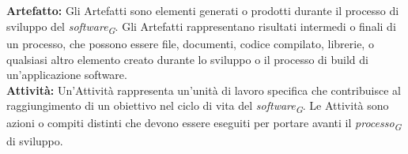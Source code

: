 \documentclass{article}
\begin{document}
\\
\\
\textbf{Artefatto:} Gli Artefatti sono elementi generati o prodotti durante il processo di sviluppo del \textit{software}\textsubscript{\textit{G}}. Gli Artefatti rappresentano risultati intermedi o finali di un processo, che possono essere file, documenti, codice compilato, librerie, o qualsiasi altro elemento creato durante lo sviluppo o il processo di build di un'applicazione software.
\pagebreak
\\
\textbf{Attività:} Un'Attività rappresenta un'unità di lavoro specifica che contribuisce al raggiungimento di un obiettivo nel ciclo di vita del \textit{software}\textsubscript{\textit{G}}. Le Attività sono azioni o compiti distinti che devono essere eseguiti per portare avanti il \textit{processo}\textsubscript{\textit{G}} di sviluppo.
\\
\\
\pagebreak
\end{document}
